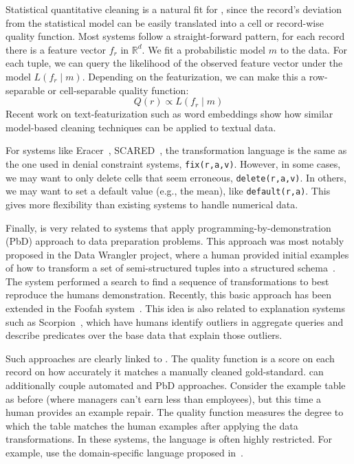 Statistical quantitative cleaning is a natural fit for \sys, since the record's deviation from the statistical model can be easily translated into a cell or record-wise quality function.  
Most systems follow a straight-forward pattern, for each record there is a feature vector $f_r$ in $\mathbb{R}^d$.
We fit a probabilistic model $m$ to the data.
For each tuple, we can query the likelihood of the observed feature vector under the model $L(f_r \mid m)$.
Depending on the featurization, we can make this a row-separable or cell-separable quality function:
\[
Q(r) \propto L(f_r \mid m)
\]
Recent work on text-featurization such as word embeddings show how similar model-based cleaning techniques can be applied to textual data.  

For systems like Eracer~\cite{eracer}, SCARED~\cite{yakout2013don}, the transformation language is the same as the one used in denial constraint systems, \texttt{fix(r,a,v)}.
However, in some cases, we may want to only delete cells that seem erroneous, \texttt{delete(r,a,v)}.
In others, we may want to set a default value (e.g., the mean), like \texttt{default(r,a)}.
This gives \sys more flexibility than existing systems to handle numerical data.

  
Finally, \sys is very related to systems that apply programming-by-demonstration (PbD) approach to data preparation problems.
This approach was most notably proposed in the Data Wrangler project, where a human provided initial examples of how to transform a set of semi-structured tuples into a structured schema~\cite{wrangler,trifacta}.
The system performed a search to find a sequence of transformations to best reproduce the humans demonstration.
Recently, this basic approach has been extended in the Foofah system~\cite{jin2017foofah}.
This idea is also related to explanation systems such as Scorpion~\cite{DBLP:journals/pvldb/0002M13}, which have humans identify outliers in aggregate queries and describe predicates over the base data that explain those outliers.

Such approaches are clearly linked to \sys. The quality function is a score on each record on how accurately it matches a manually cleaned gold-standard. \sys can additionally couple automated and PbD approaches. 
Consider the example table as before (where managers can't earn less than employees), but this time  a human provides an example repair.
The quality function measures the degree to which the table matches the human examples after applying the data transformations.
In these systems, the language is often highly restricted.
For example, \cite{wrangler, jin2017foofah} use the domain-specific language proposed in~\cite{raman2001potter}.

